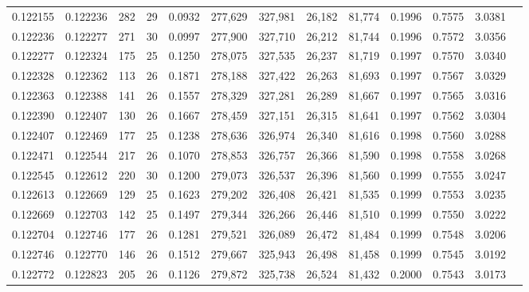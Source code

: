 \begin{tabular}{rrrrrrrrrrrrr}
0.122155 & 0.122236 & 282 &  29 &                                     0.0932 & 277,629 & 327,981 &  26,182 &  81,774 & 0.1996 & 0.7575 & 3.0381 \\
0.122236 & 0.122277 & 271 &  30 &                                     0.0997 & 277,900 & 327,710 &  26,212 &  81,744 & 0.1996 & 0.7572 & 3.0356 \\
0.122277 & 0.122324 & 175 &  25 &                                     0.1250 & 278,075 & 327,535 &  26,237 &  81,719 & 0.1997 & 0.7570 & 3.0340 \\
0.122328 & 0.122362 & 113 &  26 &                                     0.1871 & 278,188 & 327,422 &  26,263 &  81,693 & 0.1997 & 0.7567 & 3.0329 \\
0.122363 & 0.122388 & 141 &  26 &                                     0.1557 & 278,329 & 327,281 &  26,289 &  81,667 & 0.1997 & 0.7565 & 3.0316 \\
0.122390 & 0.122407 & 130 &  26 &                                     0.1667 & 278,459 & 327,151 &  26,315 &  81,641 & 0.1997 & 0.7562 & 3.0304 \\
0.122407 & 0.122469 & 177 &  25 &                                     0.1238 & 278,636 & 326,974 &  26,340 &  81,616 & 0.1998 & 0.7560 & 3.0288 \\
0.122471 & 0.122544 & 217 &  26 &                                     0.1070 & 278,853 & 326,757 &  26,366 &  81,590 & 0.1998 & 0.7558 & 3.0268 \\
0.122545 & 0.122612 & 220 &  30 &                                     0.1200 & 279,073 & 326,537 &  26,396 &  81,560 & 0.1999 & 0.7555 & 3.0247 \\
0.122613 & 0.122669 & 129 &  25 &                                     0.1623 & 279,202 & 326,408 &  26,421 &  81,535 & 0.1999 & 0.7553 & 3.0235 \\
0.122669 & 0.122703 & 142 &  25 &                                     0.1497 & 279,344 & 326,266 &  26,446 &  81,510 & 0.1999 & 0.7550 & 3.0222 \\
0.122704 & 0.122746 & 177 &  26 &                                     0.1281 & 279,521 & 326,089 &  26,472 &  81,484 & 0.1999 & 0.7548 & 3.0206 \\
0.122746 & 0.122770 & 146 &  26 &                                     0.1512 & 279,667 & 325,943 &  26,498 &  81,458 & 0.1999 & 0.7545 & 3.0192 \\
0.122772 & 0.122823 & 205 &  26 &                                     0.1126 & 279,872 & 325,738 &  26,524 &  81,432 & 0.2000 & 0.7543 & 3.0173 \\

\end{tabular}
